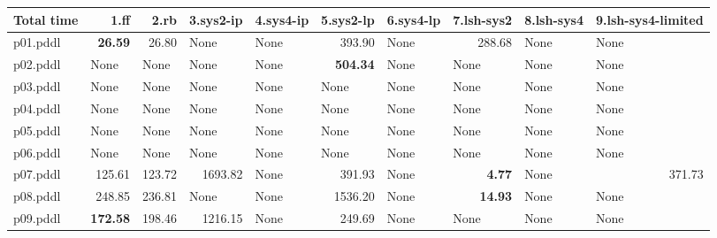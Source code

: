 \documentclass{article}
\begin{document}
\begin{tabular}{@{}lrrrrrrrrr@{}}
Total time & 1.ff & 2.rb & 3.sys2-ip & 4.sys4-ip & 5.sys2-lp & 6.sys4-lp & 7.lsh-sys2 & 8.lsh-sys4 & 9.lsh-sys4-limited \\
\midrule
p01.pddl & \textbf{26.59} & 26.80 & \multicolumn{1}{|l|}{None} & \multicolumn{1}{|l|}{None} & 393.90 & \multicolumn{1}{|l|}{None} & 288.68 & \multicolumn{1}{|l|}{None} & \multicolumn{1}{|l|}{None} \\
p02.pddl & \multicolumn{1}{|l|}{None} & \multicolumn{1}{|l|}{None} & \multicolumn{1}{|l|}{None} & \multicolumn{1}{|l|}{None} & \textbf{504.34} & \multicolumn{1}{|l|}{None} & \multicolumn{1}{|l|}{None} & \multicolumn{1}{|l|}{None} & \multicolumn{1}{|l|}{None} \\
p03.pddl & \multicolumn{1}{|l|}{None} & \multicolumn{1}{|l|}{None} & \multicolumn{1}{|l|}{None} & \multicolumn{1}{|l|}{None} & \multicolumn{1}{|l|}{None} & \multicolumn{1}{|l|}{None} & \multicolumn{1}{|l|}{None} & \multicolumn{1}{|l|}{None} & \multicolumn{1}{|l|}{None} \\
p04.pddl & \multicolumn{1}{|l|}{None} & \multicolumn{1}{|l|}{None} & \multicolumn{1}{|l|}{None} & \multicolumn{1}{|l|}{None} & \multicolumn{1}{|l|}{None} & \multicolumn{1}{|l|}{None} & \multicolumn{1}{|l|}{None} & \multicolumn{1}{|l|}{None} & \multicolumn{1}{|l|}{None} \\
p05.pddl & \multicolumn{1}{|l|}{None} & \multicolumn{1}{|l|}{None} & \multicolumn{1}{|l|}{None} & \multicolumn{1}{|l|}{None} & \multicolumn{1}{|l|}{None} & \multicolumn{1}{|l|}{None} & \multicolumn{1}{|l|}{None} & \multicolumn{1}{|l|}{None} & \multicolumn{1}{|l|}{None} \\
p06.pddl & \multicolumn{1}{|l|}{None} & \multicolumn{1}{|l|}{None} & \multicolumn{1}{|l|}{None} & \multicolumn{1}{|l|}{None} & \multicolumn{1}{|l|}{None} & \multicolumn{1}{|l|}{None} & \multicolumn{1}{|l|}{None} & \multicolumn{1}{|l|}{None} & \multicolumn{1}{|l|}{None} \\
p07.pddl & 125.61 & 123.72 & 1693.82 & \multicolumn{1}{|l|}{None} & 391.93 & \multicolumn{1}{|l|}{None} & \textbf{4.77} & \multicolumn{1}{|l|}{None} & 371.73 \\
p08.pddl & 248.85 & 236.81 & \multicolumn{1}{|l|}{None} & \multicolumn{1}{|l|}{None} & 1536.20 & \multicolumn{1}{|l|}{None} & \textbf{14.93} & \multicolumn{1}{|l|}{None} & \multicolumn{1}{|l|}{None} \\
p09.pddl & \textbf{172.58} & 198.46 & 1216.15 & \multicolumn{1}{|l|}{None} & 249.69 & \multicolumn{1}{|l|}{None} & \multicolumn{1}{|l|}{None} & \multicolumn{1}{|l|}{None} & \multicolumn{1}{|l|}{None} \\

\end{tabular}
\end{document}
